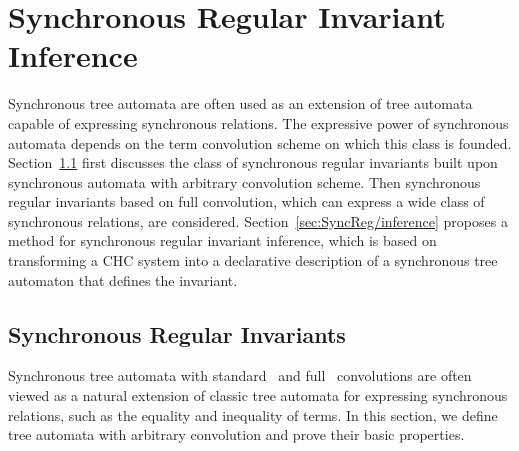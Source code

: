 \chapter{Synchronous Regular Invariant Inference}\label{ch:SyncReg}

Synchronous tree automata are often used as an extension of tree automata capable of expressing synchronous relations.
The expressive power of synchronous automata depends on the term convolution scheme on which this class is founded.
Section~\cref{sec:SyncReg/syncAutomata} first discusses the class of synchronous regular invariants built upon synchronous automata with arbitrary convolution scheme. Then synchronous regular invariants based on full convolution, which can express a wide class of synchronous relations, are considered. Section~\cref{sec:SyncReg/inference} proposes a method for synchronous regular invariant inference, which is based on transforming a CHC system into a declarative description of a synchronous tree automaton that defines the invariant.

\section{Synchronous Regular Invariants}\label{sec:SyncReg/syncAutomata}
Synchronous tree automata with standard~\cite{tata} and full~\cite{haude2020} convolutions are often viewed as a natural extension of classic tree automata for expressing synchronous relations, such as the equality and inequality of terms. In this section, we define tree automata with arbitrary convolution and prove their basic properties.

